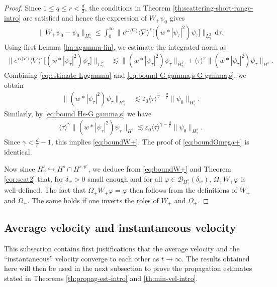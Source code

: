 \documentclass[12pt]{article}
\theoremstyle{plain}
\begin{document}
\begin{proof}
Since $1\le q\le r<\frac d2$, the conditions in  Theorem \ref{th:scattering-short-range-intro} are satisfied and hence the expression of $W_+\psi_0$ gives
    \begin{align*}
			\|W_+\psi_0-\psi_0\|_{H^s_\gamma} \le  \int_0^\infty \big\| e^{i\tau\langle\nabla\rangle} \langle\nabla\rangle^s\big[(w * |\psi_\tau|^2)\psi_\tau\big]\big\|_{L^2_\gamma}\, \mathrm{d}\tau.
    \end{align*}
  Using first Lemma \ref{lm:xgamma-lin}, we estimate the integrated norm as
    \begin{align*}
        \big\| e^{i\tau\langle\nabla\rangle} \langle\nabla\rangle^s\big[(w * |\psi_\tau|^2)\psi_\tau\big]\big\|_{L^2_\gamma}&\lesssim \big\| (w * |\psi_\tau|^2)\psi_\tau\big\|_{H^s_\gamma} + \langle\tau\rangle^{\gamma} \big\|(w * |\psi_\tau|^2)\psi_\tau\big\|_{H^s}.
    \end{align*}
Combining \eqref{eq:estimate-Lpgamma} and \eqref{eq:bound G gamma,s-G gamma,s}, we obtain
\begin{align*}
   \big\|(w * |\psi_\tau|^2)\psi_\tau\big\|_{H^s_\gamma} &\lesssim  \varepsilon_0\langle \tau\rangle^{\gamma-\frac{d}{r}} \|\psi_0\|_{H^s_\gamma}.
\end{align*}
Similarly, by \eqref{eq:bound Hs-G gamma,s} we have
\begin{align*}
\langle\tau\rangle^{\gamma}\|(w * |\psi_\tau|^2)\psi_\tau\|_{H^s} \lesssim \varepsilon_0\langle \tau\rangle^{\gamma-\frac{d}{r}} \|\psi_0\|_{H^s_\gamma}.
\end{align*}
Since $\gamma<\frac dr-1$, this implies \eqref{eq:boundW+}. The proof of \eqref{eq:boundOmega+} is identical.

Now since $H^s_\gamma\hookrightarrow H^s\cap H^{s,p'}$, we deduce from \eqref{eq:boundW+} and Theorem \ref{cor:scat2} that, for $\delta_w>0$ small enough and for all $\varphi\in\mathcal{B}_{H^s_\gamma}(\delta_w)$, $\Omega_+W_+\varphi$ is well-defined. The fact that $\Omega_+W_+\varphi=\varphi$ then follows from the definitions of $W_+$ and $\Omega_+$. The same holds if one inverts the roles of $W_+$ and $\Omega_+$.
\end{proof}



\subsection{Average velocity and instantaneous velocity}

This subsection contains first justifications that the average velocity and the ``instantaneous'' velocity converge to each other as $t\to\infty$. The results obtained here will then be used in the next subsection to prove the propagation estimates stated in Theorems \ref{th:propag-est-intro} and \ref{th:min-vel-intro}.
\end{document}
